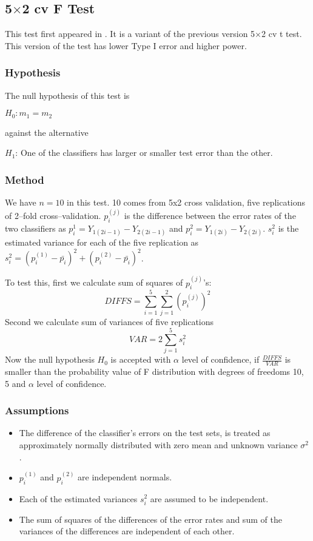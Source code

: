 \documentclass[a4paper,12pt]{book}
\begin{document}
\subsection{5$\times$2 cv F Test}
This test first appeared in \cite{alpaydin99}. It is a variant of the previous version 
5$\times$2 cv t test. This version of the test has lower Type I
error and higher power.

\subsubsection{Hypothesis}
The null hypothesis of this test is  
\begin{center}
$H_0: m_1=m_2$
\end{center}
against the alternative
\begin{center}
$H_1$: One of the classifiers has larger or smaller test error than the other.
\end{center}

\subsubsection{Method}
We have $n=10$ in this test. 10 comes from 5x2 cross validation, five replications of 2--fold cross--validation.
$p_i^{(j)}$ is the difference between the error rates of the two classifiers as
$p_i^{1}=Y_{1(2i-1)}-Y_{2(2i-1)}$ and $p_i^{2}=Y_{1(2i)}-Y_{2(2i)}$. $s_i^2$ is the estimated
variance for each of the five replication as $s_i^2=(p_i^{(1)}-\bar{p_i})^2+(p_i^{(2)}-\bar{p_i})^2$.

To test this, first we calculate sum of squares of $p_i^{(j)}$'s:
\begin{equation}
DIFFS=\sum_{i=1}^5\sum_{j=1}^2(p_i^{(j)})^2
\end{equation}
Second we calculate sum of variances of five replications
\begin{equation}
VAR=2\sum_{j=1}^5s_i^2
\end{equation}
Now the null hypothesis $H_0$ is accepted with $\alpha$ level of confidence, if $\frac{DIFFS}{VAR}$ is smaller than the probability value of F distribution with degrees of freedoms 10, 5 and $\alpha$ level of confidence.

\subsubsection{Assumptions}
\begin{itemize}
\item The difference of the classifier's errors on the test sets, is treated as approximately normally distributed
with zero mean and unknown variance $\sigma^2$.
\item $p_i^{(1)}$ and $p_i^{(2)}$ are independent normals.
\item Each of the estimated variances $s_i^2$ are assumed to be independent.
\item The sum of squares of the differences of the error rates and sum of the variances of the differences are independent of each other. 
\end{itemize}
\end{document}
